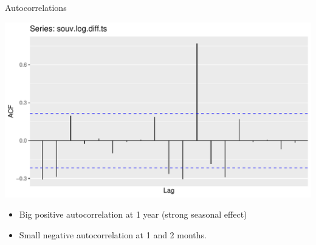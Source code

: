 \documentclass[ignorenonframetext,]{beamer}
\newenvironment{Shaded}{\begin{snugshade}}{\end{snugshade}}
\newcommand{\DataTypeTok}[1]{\textcolor[rgb]{0.13,0.29,0.53}{#1}}
\newcommand{\KeywordTok}[1]{\textcolor[rgb]{0.13,0.29,0.53}{\textbf{#1}}}
\newcommand{\NormalTok}[1]{#1}
\newcommand{\OperatorTok}[1]{\textcolor[rgb]{0.81,0.36,0.00}{\textbf{#1}}}
\newcommand{\StringTok}[1]{\textcolor[rgb]{0.31,0.60,0.02}{#1}}
\providecommand{\tightlist}{%
  \setlength{\itemsep}{0pt}\setlength{\parskip}{0pt}}
\begin{document}
\begin{frame}[fragile]{Autocorrelations}
\protect\hypertarget{autocorrelations}{}

\begin{Shaded}
\end{Shaded}

\includegraphics{figure/unnamed-chunk-547-1.pdf}

\begin{itemize}
\tightlist
\item
  Big positive autocorrelation at 1 year (strong seasonal effect)
\item
  Small negative autocorrelation at 1 and 2 months.
\end{itemize}

\end{frame}
\end{document}
